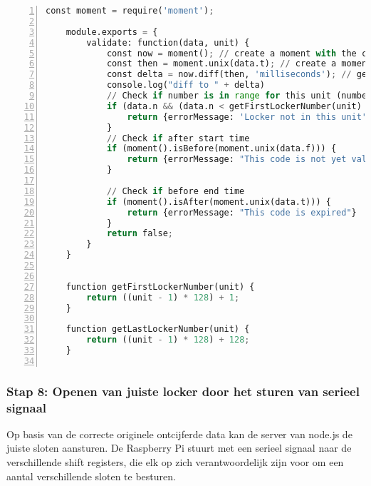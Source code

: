 \begin{lstlisting}[language=Python, caption={Validatie van QR-code op tijd en bijpassende QR-unit.}, label=lst:data-validator, numbers=left]
    const moment = require('moment');
    
    module.exports = {
        validate: function(data, unit) {
            const now = moment(); // create a moment with the current time
            const then = moment.unix(data.t); // create a moment with the other time timestamp in seconds
            const delta = now.diff(then, 'milliseconds'); // get the millisecond difference
            console.log("diff to " + delta)
            // Check if number is in range for this unit (number is not mandatory)
            if (data.n && (data.n < getFirstLockerNumber(unit) || data.n > getLastLockerNumber(unit))) {
                return {errorMessage: 'Locker not in this unit'}
            }
            // Check if after start time
            if (moment().isBefore(moment.unix(data.f))) {
                return {errorMessage: "This code is not yet valid"}
            }
            
            // Check if before end time
            if (moment().isAfter(moment.unix(data.t))) {
                return {errorMessage: "This code is expired"}
            }
            return false;
        }
    }
    
    
    function getFirstLockerNumber(unit) {
        return ((unit - 1) * 128) + 1;
    }
    
    function getLastLockerNumber(unit) {
        return ((unit - 1) * 128) + 128;
    }
    
\end{lstlisting}

\subsubsection{Stap 8: Openen van juiste locker door het sturen van serieel signaal} 

Op basis van de correcte originele ontcijferde data kan de server van node.js de juiste sloten aansturen. De Raspberry Pi stuurt met een serieel signaal naar de verschillende shift registers, die elk op zich verantwoordelijk zijn voor om een aantal verschillende sloten te besturen.

